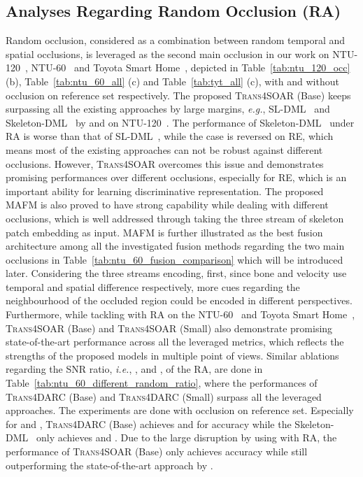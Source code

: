 \documentclass[lettersize,journal]{IEEEtran}
\begin{document}
\subsection{Analyses Regarding Random Occlusion (RA)}
Random occlusion, considered as a combination between random temporal and spatial occlusions, is leveraged as the second main occlusion in our work on NTU-120~\cite{liu2019ntu}, NTU-60~\cite{shahroudy2016ntu} and Toyota Smart Home~\cite{Das_2019_ICCV}, depicted in Table~\ref{tab:ntu_120_occ} (b), Table~\ref{tab:ntu_60_all} (c) and Table~\ref{tab:tyt_all} (c), with  and without occlusion on reference set respectively.
The proposed \textsc{Trans4SOAR} (Base) keeps surpassing all the existing approaches by large margins, \textit{e.g.}, SL-DML~\cite{memmesheimer2021sl} and Skeleton-DML~\cite{memmesheimer2020skeleton_dml} by  and  on NTU-120~\cite{liu2019ntu}.
The performance of Skeleton-DML~\cite{memmesheimer2020skeleton_dml} under RA is worse than that of SL-DML~\cite{memmesheimer2021sl}, while the case is reversed on RE, which means most of the existing approaches can not be robust against different occlusions.
However, \textsc{Trans4SOAR} overcomes this issue and demonstrates promising performances over different occlusions, especially for RE, which is an important ability for learning discriminative representation.
The proposed MAFM is also proved to have strong capability while dealing with different occlusions, which is well addressed through taking the three stream of skeleton patch embedding as input.
MAFM is further illustrated as the best fusion architecture among all the investigated fusion methods regarding the two main occlusions in Table~\ref{tab:ntu_60_fusion_comparison} which will be introduced later.
Considering the three streams encoding, first, since bone and velocity use temporal and spatial difference respectively, more cues regarding the neighbourhood of the occluded region could be encoded in different perspectives.
Furthermore, while tackling with RA on the NTU-60~\cite{shahroudy2016ntu} and Toyota Smart Home~\cite{Das_2019_ICCV}, \textsc{Trans4SOAR} (Base) and \textsc{Trans4SOAR} (Small) also demonstrate promising state-of-the-art performance across all the leveraged metrics, which reflects the strengths of the proposed models in multiple point of views. Similar ablations regarding the SNR ratio, \textit{i.e.}, ,  and , of the RA, are done in Table~\ref{tab:ntu_60_different_random_ratio}, where the performances of \textsc{Trans4DARC} (Base) and \textsc{Trans4DARC} (Small) surpass all the leveraged approaches. The experiments are done with occlusion on reference set. Especially for  and , \textsc{Trans4DARC} (Base) achieves  and  for accuracy while the Skeleton-DML~\cite{memmesheimer2020skeleton_dml} only achieves  and . Due to the large disruption by using  with RA, the performance of \textsc{Trans4SOAR} (Base) only achieves  accuracy while still outperforming the state-of-the-art approach by .
\end{document}
